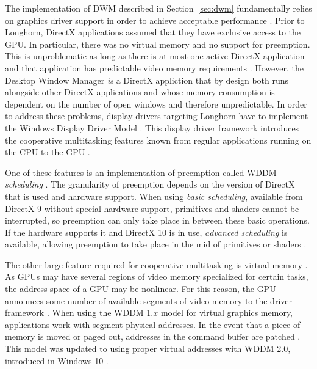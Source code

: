 		\label{sec:wddm}
			The implementation of DWM described in Section~\ref{sec:dwm}
			fundamentally relies on graphics driver support in order to achieve
			acceptable performance \cite{dwmwddm}.  Prior to Longhorn, DirectX applications
			assumed that they have exclusive access to the GPU. In particular,
			there was no virtual memory and no support for preemption. This is
			unproblematic as long as there is at most one active DirectX application
			and that application has predictable video memory requirements \cite{dwmwddm}.
			However, the Desktop Window Manager \emph{is} a DirectX appliction that
			by design both runs alongside other DirectX applications and whose
			memory consumption is dependent on the number of open windows and therefore
			unpredictable.
			In order to address these problems, display drivers targeting Longhorn
			have to implement the Windows Display Driver Model \cite{dwmalwayson}. This
			display driver framework introduces the cooperative multitasking
			features known from regular applications running on the CPU to the
			GPU \cite{dwmwddm}.

			One of these features is an implementation of preemption called
			WDDM \emph{scheduling} \cite{dwmwddm}. The granularity of preemption depends on
			the version of DirectX that is used and hardware support. When
			using \emph{basic scheduling}, available from DirectX 9 without
			special hardware support, primitives and shaders cannot be interrupted,
			so preemption can only take place in between these basic operations.
			If the hardware supports it and DirectX 10 is in use, \emph{advanced
			scheduling} is available, allowing preemption to take place in the mid
			of primitives or shaders \cite{dwmwddm}.

			The other large feature required for cooperative multitasking is
			virtual memory \cite{dwmwddm}. As GPUs may have several regions of video memory
			specialized for certain tasks, the address space of a GPU may
			be nonlinear. For this reason, the GPU announces some number of
			available segments of video memory to the driver framework \cite{gpuseg}.
			When using the WDDM 1.$x$ model for virtual graphics
			memory, applications work with segment physical addresses. In the event
			that a piece of memory is moved or paged out, addresses in the command
			buffer are patched \cite{wddm2}. This model was updated to using proper virtual
			addresses with WDDM 2.0, introduced in Windows 10 \cite{wddm2}.

